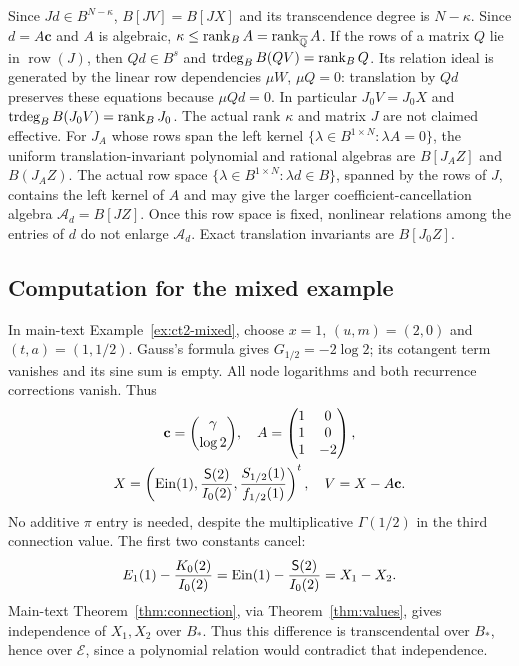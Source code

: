Since $Jd\in B^{N-\kappa}$, $B[JV]=B[JX]$ and its transcendence
degree is $N-\kappa$.
Since $d=A\mathbf c$ and $A$ is algebraic, $\kappa\le\operatorname{rank}_B A=\operatorname{rank}_{{\overline{\mathbb{Q}}}}A$.
If the rows of a matrix $Q$ lie in
$\operatorname{row}(J)$, then $Qd\in B^s$ and
$\operatorname{trdeg}_B B(QV)=\operatorname{rank}_BQ$. Its relation ideal is generated by
the linear row dependencies $\mu W$, $\mu Q=0$: translation by $Qd$
preserves these equations because $\mu Qd=0$.
In particular $J_0V=J_0X$ and
$\operatorname{trdeg}_B B(J_0V)=\operatorname{rank}_BJ_0$.
The actual rank $\kappa$ and matrix $J$ are not claimed effective.
For $J_A$ whose rows span the left kernel $\{\lambda\in B^{1\times N}:\lambda A=0\}$, the uniform translation-invariant
polynomial and rational algebras are $B[J_AZ]$ and $B(J_AZ)$.
The actual row space $\{\lambda\in B^{1\times N}:\lambda d\in B\}$,
spanned by the rows of $J$, contains the left kernel of $A$ and may give
the larger coefficient-cancellation algebra $\mathcal A_d=B[JZ]$.
Once this row space is fixed, nonlinear relations among the entries of $d$
do not enlarge $\mathcal A_d$. Exact translation invariants are $B[J_0Z]$.

\subsection*{Computation for the mixed example}
In main-text Example~\ref{ex:ct2-mixed}, choose
$x=1$, $(u,m)=(2,0)$ and $(t,a)=(1,1/2)$.
Gauss's formula gives $G_{1/2}=-2\log2$; its cotangent term vanishes
and its sine sum is empty. All node logarithms and both recurrence
corrections vanish. Thus
\[
\begin{gathered}
 \mathbf c=\binom\gamma{\log2},\quad
 A=\begin{pmatrix}1&0\\1&0\\1&-2\end{pmatrix},\\
 X=\left(\operatorname{Ein}(1),\frac{\mathsf S(2)}{I_0(2)},
 \frac{S_{1/2}(1)}{f_{1/2}(1)}\right)^t,\quad V=X-A\mathbf c.
\end{gathered}
\]
No additive $\pi$ entry is needed, despite the multiplicative
$\Gamma(1/2)$ in the third connection value.
The first two constants cancel:
\[
 E_1(1)-\frac{K_0(2)}{I_0(2)}
 =\operatorname{Ein}(1)-\frac{\mathsf S(2)}{I_0(2)}=X_1-X_2.
\]
Main-text Theorem~\ref{thm:connection}, via Theorem~\ref{thm:values},
gives independence of $X_1,X_2$ over $B_*$. Thus this difference is
transcendental over $B_*$, hence over $\mathcal E$, since a polynomial
relation would contradict that independence.

